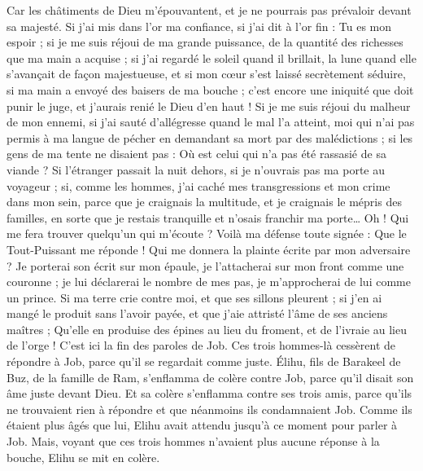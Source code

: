 \begin{multicols}{2}
Car les châtiments de Dieu m'épouvantent, et je ne pourrais pas prévaloir devant sa majesté.
Si j'ai mis dans l'or ma confiance, si j'ai dit à l'or fin : Tu es mon espoir ;
si je me suis réjoui de ma grande puissance, de la quantité des richesses que ma main a acquise ;
si j'ai regardé le soleil quand il brillait, la lune quand elle s'avançait de façon majestueuse,
et si mon cœur s'est laissé secrètement séduire, si ma main a envoyé des baisers de ma bouche ;
c'est encore une iniquité que doit punir le juge, et j'aurais renié le Dieu d'en haut !
Si je me suis réjoui du malheur de mon ennemi, si j'ai sauté d'allégresse quand le mal l'a atteint,
moi qui n'ai pas permis à ma langue de pécher en demandant sa mort par des malédictions ;
si les gens de ma tente ne disaient pas : Où est celui qui n'a pas été rassasié de sa viande ?
Si l'étranger passait la nuit dehors, si je n'ouvrais pas ma porte au voyageur ;
si, comme les hommes, j'ai caché mes transgressions et mon crime dans mon sein,
parce que je craignais la multitude, et je craignais le mépris des familles, en sorte que je restais tranquille et n'osais franchir ma porte…
Oh ! Qui me fera trouver quelqu'un qui m'écoute ? Voilà ma défense toute signée : Que le Tout-Puissant me réponde ! Qui me donnera la plainte écrite par mon adversaire ?
Je porterai son écrit sur mon épaule, je l'attacherai sur mon front comme une couronne ;
je lui déclarerai le nombre de mes pas, je m'approcherai de lui comme un prince.
Si ma terre crie contre moi, et que ses sillons pleurent ;
si j'en ai mangé le produit sans l'avoir payée, et que j'aie attristé l'âme de ses anciens maîtres ;
Qu'elle en produise des épines au lieu du froment, et de l'ivraie au lieu de l'orge ! C'est ici la fin des paroles de Job.
\VerseOne{}Ces trois hommes-là cessèrent de répondre à Job, parce qu'il se regardait comme juste.
Élihu, fils de Barakeel de Buz, de la famille de Ram, s'enflamma de colère contre Job, parce qu'il disait son âme juste devant Dieu.
Et sa colère s'enflamma contre ses trois amis, parce qu'ils ne trouvaient rien à répondre et que néanmoins ils condamnaient Job.
Comme ils étaient plus âgés que lui, Elihu avait attendu jusqu'à ce moment pour parler à Job.
Mais, voyant que ces trois hommes n'avaient plus aucune réponse à la bouche, Elihu se mit en colère.

\end{multicols}
